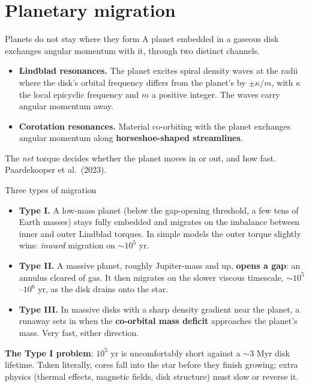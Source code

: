 \documentclass[aspectratio=169, 11pt]{beamer}
\begin{document}
\section{Planetary migration}

\begin{frame}{Planets do not stay where they form}
  A planet embedded in a gaseous disk exchanges angular momentum with it, through two distinct channels.
  \vskip4pt\relax
  \begin{itemize}
    \item \textbf{Lindblad resonances.} The planet excites spiral density waves at the radii where the disk's orbital frequency differs from the planet's by $\pm \kappa/m$, with $\kappa$ the local epicyclic frequency and $m$ a positive integer. The waves carry angular momentum away.
    \item \textbf{Corotation resonances.} Material co-orbiting with the planet exchanges angular momentum along \textbf{horseshoe-shaped streamlines}.
  \end{itemize}
  \vskip6pt\relax
  The \emph{net} torque decides whether the planet moves in or out, and how fast.
  \vskip2pt\relax
  \vskip2pt\relax
  {\footnotesize Paardekooper et al.\ (2023).}
\end{frame}

\begin{frame}{Three types of migration}
  \begin{itemize}
    \item \textbf{Type I.} A low-mass planet (below the gap-opening threshold, a few tens of Earth masses) stays fully embedded and migrates on the imbalance between inner and outer Lindblad torques. In simple models the outer torque slightly wins: \emph{inward} migration on $\sim 10^5$ yr.
    \vskip3pt\relax
    \item \textbf{Type II.} A massive planet, roughly Jupiter-mass and up, \textbf{opens a gap}: an annulus cleared of gas. It then migrates on the slower viscous timescale, $\sim 10^5$--$10^6$ yr, as the disk drains onto the star.
    \vskip3pt\relax
    \item \textbf{Type III.} In massive disks with a sharp density gradient near the planet, a runaway sets in when the \textbf{co-orbital mass deficit} approaches the planet's mass. Very fast, either direction.
  \end{itemize}
  \vskip2pt\relax
  \textbf{The Type I problem}: $10^5$ yr is uncomfortably short against a $\sim 3$ Myr disk lifetime. Taken literally, cores fall into the star before they finish growing; extra physics (thermal effects, magnetic fields, disk structure) must slow or reverse it.
\end{frame}
\end{document}
